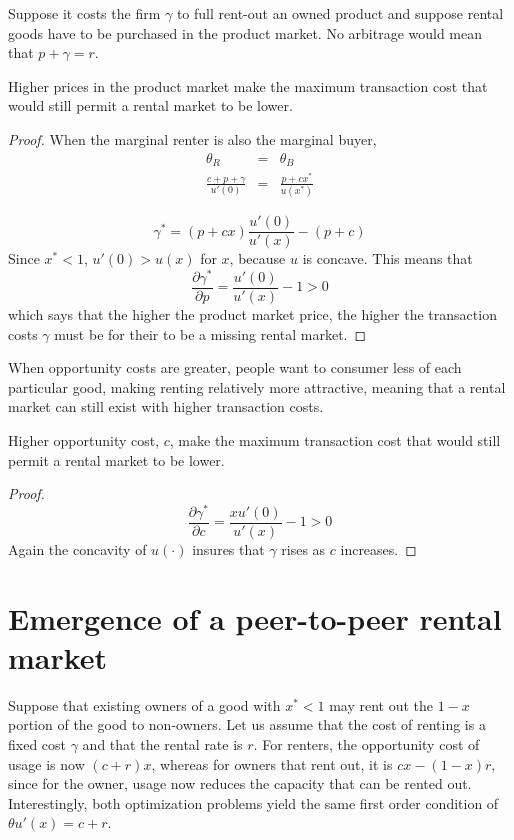 \documentclass[11pt]{article}
\begin{document}
Suppose it costs the firm $\gamma$ to full rent-out an owned product and suppose rental goods have to be purchased in the product market. 
No arbitrage would mean that $p + \gamma = r$. 


\begin{prop}
Higher prices in the product market make the maximum transaction cost that would still permit a rental market to be lower. 
\end{prop} 
\begin{proof} 
When the marginal renter is also the marginal buyer, 
\begin{eqnarray*}
\theta_R &=& \theta_B \\
\frac{c + p + \gamma}{u'(0)} &=& \frac{p + cx^*}{u(x^*)} 
\end{eqnarray*} 

\begin{equation}
\gamma^* = (p + cx) \frac{u'(0)}{u'(x)} - (p + c) 
\end{equation} 
Since $x^* < 1$, $u'(0) > u(x)$ for $x$, because $u$ is concave. 
This means that 
\begin{equation}
\frac{\partial \gamma^*}{\partial p} = \frac{u'(0)}{u'(x)} - 1 > 0
\end{equation} 
which says that the higher the product market price, the higher the transaction costs $\gamma$ must be for their to be a missing rental market. 
\end{proof} 

When opportunity costs are greater, people want to consumer less of each particular good, making renting relatively more attractive, meaning that a rental market can still exist with higher transaction costs. 

\begin{prop}
Higher opportunity cost, $c$, make the maximum transaction cost that would still permit a rental market to be lower. 
\end{prop} 
\begin{proof}
\begin{equation}
\frac{\partial \gamma^*}{\partial c} = \frac{x u'(0)}{u'(x)} - 1 > 0 
\end{equation} 
Again the concavity of $u(\cdot)$ insures that $\gamma$ rises as $c$ increases. 
\end{proof} 



\section{Emergence of a peer-to-peer rental market} 
Suppose that existing owners of a good with $x^* < 1$ may rent out the $1-x$ portion of the good to non-owners. 
Let us assume that the cost of renting is a fixed cost $\gamma$ and that the rental rate is $r$. 
For renters, the opportunity cost of usage is now $(c + r)x$, whereas for owners that rent out, it is $cx - (1 - x)r$, since for the owner, usage now reduces the capacity that can be rented out.  
Interestingly, both optimization problems yield the same first order condition of $\theta u'(x) = c + r$. 
\end{document}
